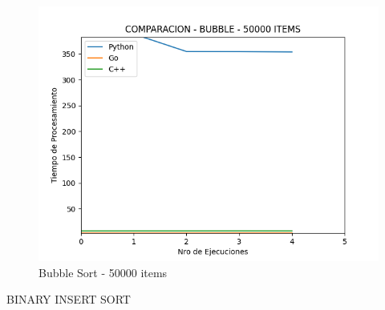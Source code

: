 \documentclass[12pt]{article} %
\begin{document}
    \begin{figure}[H]
    \centering
    \includegraphics[width=\textwidth]{bubble_50000}
    \caption{Bubble Sort - 50000 items}
    \end{figure}

    \vspace{8cm}

BINARY INSERT SORT
\end{document}
